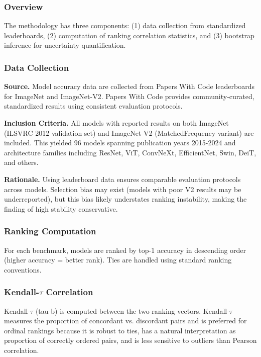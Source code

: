 
\subsubsection{Overview}

The methodology has three components: (1) data collection from standardized leaderboards, (2) computation of ranking correlation statistics, and (3) bootstrap inference for uncertainty quantification.

\subsubsection{Data Collection}

\textbf{Source.} Model accuracy data are collected from Papers With Code leaderboards for ImageNet and ImageNet-V2. Papers With Code provides community-curated, standardized results using consistent evaluation protocols.

\textbf{Inclusion Criteria.} All models with reported results on both ImageNet (ILSVRC 2012 validation set) and ImageNet-V2 (MatchedFrequency variant) are included. This yielded 96 models spanning publication years 2015-2024 and architecture families including ResNet, ViT, ConvNeXt, EfficientNet, Swin, DeiT, and others.

\textbf{Rationale.} Using leaderboard data ensures comparable evaluation protocols across models. Selection bias may exist (models with poor V2 results may be underreported), but this bias likely understates ranking instability, making the finding of high stability conservative.

\subsubsection{Ranking Computation}

For each benchmark, models are ranked by top-1 accuracy in descending order (higher accuracy = better rank). Ties are handled using standard ranking conventions.

\subsubsection{Kendall-$\tau$ Correlation}

Kendall-$\tau$ (tau-b) is computed between the two ranking vectors. Kendall-$\tau$ measures the proportion of concordant vs. discordant pairs and is preferred for ordinal rankings because it is robust to ties, has a natural interpretation as proportion of correctly ordered pairs, and is less sensitive to outliers than Pearson correlation.

